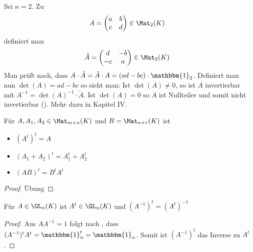 \begin{example}
	Sei $n=2$. Zu
	\begin{align}
		A=\begin{pmatrix}a & b\\c & d\\\end{pmatrix} \in \Mat_2(K)\notag
	\end{align} 
	definiert man
	\begin{align}
		\tilde A=
		\begin{pmatrix}d & -b\\-c & a\\\end{pmatrix}\in \Mat_2(K)\notag
	\end{align}
	Man prüft nach, dass $A\cdot \tilde A=\tilde A\cdot A=
	(ad-bc)\cdot \mathbbm{1}_2$. Definiert man nun $\det(A)=ad-bc$ so sieht man: Ist $\det(A)\neq 0$, so ist $A$ invertierbar mit 
	$A^{-1}=\det(A)^{-1}\cdot \tilde A$. Ist $\det(A)=0$ so $A$ ist Nullteiler und somit nicht invertierbar (). Mehr dazu in Kapitel IV.
\end{example}

\begin{lemma}
	Für $A,A_1,A_2\in \Mat_{m\times n}(K)$ und $B=\Mat_{n\times r}(K)$ ist 
	\begin{itemize}
		\item $(A^t)^t=A$
		\item $(A_1+A_2)^t=A_1^t + A_2^t$
		\item $(AB)^t=B^tA^t$
	\end{itemize}
\end{lemma}
\begin{proof}
	Übung
\end{proof}

\begin{proposition}
	Für $A\in \GL_n(K)$ ist $A^t\in \GL_n(K)$ und $(A^{-1})^t = (A^t)^{-1}$
\end{proposition}
\begin{proof}
	Aus $AA^{-1}=1$ folgt nach , dass $(A^{-1})^tA^t=\mathbbm{1}_n^t=\mathbbm{1}_n$. Somit ist $(A^{-1})^t$ das Inverse zu $A^t$.
\end{proof}
